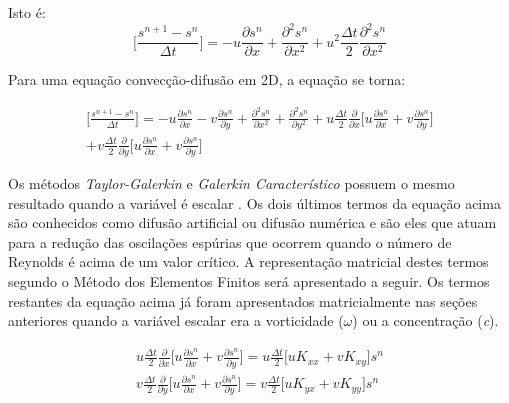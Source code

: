Isto é:
\begin{equation}
 \bigg[
 \frac{s^{n+1} - s^{n}}{\Delta t}
 \bigg]
 =  
 - u \frac{\partial s^{n}}{\partial x}
 + \frac{\partial^2 s^{n}}{\partial x^2} 
 + u^2 
 \frac{\Delta t}{2}
 \frac{\partial^2 s^{n}}{\partial x^2}
\end{equation}

\medskip
Para uma equação convecção-difusão em 2D, a equação se torna:

\begin{equation}
\begin{aligned}
 \bigg[
 \frac{s^{n+1} - s^{n}}{\Delta t}
 \bigg]
 =  
 - u \frac{\partial s^{n}}{\partial x}
 - v \frac{\partial s^{n}}{\partial y}
 + \frac{\partial^2 s^{n}}{\partial x^2} 
 + \frac{\partial^2 s^{n}}{\partial y^2} 
 + u 
 \frac{\Delta t}{2}
 \frac{\partial}{\partial x}
 \bigg[
 u \frac{\partial s^{n}}{\partial x}
 + v \frac{\partial s^{n}}{\partial y}
 \bigg] \\
 + v 
 \frac{\Delta t}{2}
 \frac{\partial}{\partial y}
 \bigg[
 u \frac{\partial s^{n}}{\partial x}
 + v \frac{\partial s^{n}}{\partial y}
 \bigg]
\end{aligned}
\end{equation}

\medskip
Os métodos \textit{Taylor-Galerkin} e \textit{Galerkin Característico}
possuem o mesmo resultado quando a variável é escalar \cite{lohner1984}.
Os dois últimos termos da equação acima são conhecidos como
difusão artificial ou difusão numérica e são eles que atuam
para a redução das oscilações espúrias que ocorrem quando
o número de Reynolds é acima de um valor crítico. A representação matricial
destes termos segundo o Método dos Elementos Finitos será
apresentado a seguir. Os termos restantes da equação acima já
foram apresentados matricialmente nas seções anteriores quando
a variável escalar era a vorticidade ($\omega$) ou a concentração (\textit{c}).


\begin{align}
 u 
 \frac{\Delta t}{2}
 \frac{\partial}{\partial x}
 \bigg[
 u \frac{\partial s^{n}}{\partial x}
 + v \frac{\partial s^{n}}{\partial y}
 \bigg]
 = 
 u
 \frac{\Delta t}{2}
 \Big[
 u K_{xx}
 + v K_{xy}
 \Big]
 s^{n}\\
 v 
 \frac{\Delta t}{2}
 \frac{\partial}{\partial y}
 \bigg[
 u \frac{\partial s^{n}}{\partial x}
 + v \frac{\partial s^{n}}{\partial y}
 \bigg]
 = 
 v
 \frac{\Delta t}{2}
 \Big[
 u K_{yx}
 + v K_{yy}
 \Big]
 s^{n}
\end{align}

